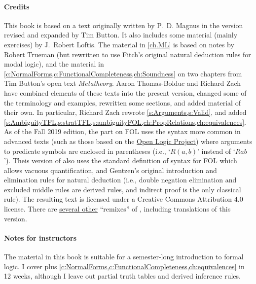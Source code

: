 \paragraph{Credits} This book is based on a text originally written by
P.~D. Magnus in the version revised and expanded by Tim Button. It
also includes some material (mainly exercises) by J.~Robert Loftis.
The material in \cref{ch.ML} is based on notes by Robert Trueman (but
rewritten to use Fitch's original natural deduction rules for modal
logic), and the material in
\cref{c:NormalForms,c:FunctionalCompleteness,ch:Soundness} on two
chapters from Tim Button's open text \textit{Metatheory}. Aaron
Thomas-Bolduc and Richard Zach have combined elements of these texts
into the present version, changed some of the terminology and
examples, rewritten some sections, and added material of their own. In
particular, Richard Zach rewrote \cref{s:Arguments,s:Valid}, and added
\cref{s:AmbiguityTFL,s:stratTFL,s:ambiguityFOL,ch:PropRelations,ch:equivalences}.
As of the Fall 2019 edition, the part on FOL uses the syntax more
common in advanced texts (such as those based on the
\href{https://openlogicproject.org/}{Open Logic Project}) where
arguments to predicate symbols are enclosed in parentheses (i.e.,
`$R(a,b)$' instead of `$Rab$'). Theis version of \forallx{} also uses
the standard definition of syntax for FOL which allows vacuous
quantification, and Gentzen's original introduction and elimination
rules for natural deduction (i.e., double negation elimination and
excluded middle rules are derived rules, and indirect proof is the
only classical rule). The resulting text is licensed under a Creative
Commons Attribution 4.0 license. There are
\href{https://github.com/OpenLogicProject/OpenLogic/wiki/Other-Logic-Textbooks}{several
other} ``remixes'' of \forallx, including translations of this
version.

\paragraph{Notes for instructors} The material in this book is suitable for a semester-long introduction to formal logic. I cover  plus \cref{c:NormalForms,c:FunctionalCompleteness,ch:equivalences} in 12 weeks, although I leave out partial truth tables and derived inference rules.

